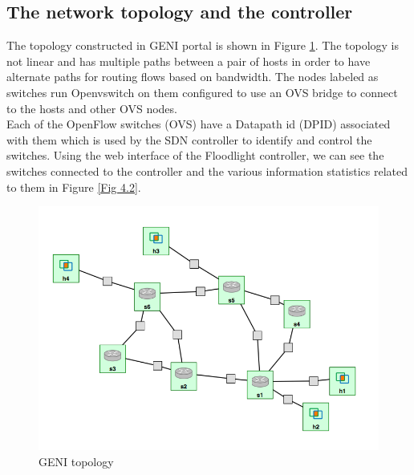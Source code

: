\documentclass[paper=a4, fontsize=11pt]{scrartcl}	%
\numberwithin{equation}{section}		%
\numberwithin{figure}{section}			%
\numberwithin{table}{section}				%
\begin{document}
\subsection{The network topology and the controller}
The topology constructed in GENI portal is shown in Figure \ref{Fig 4.1}. The topology is not linear and has multiple paths between a pair of hosts in order to have alternate paths for routing flows based on bandwidth. The nodes labeled as switches run Openvswitch on them configured to use an OVS bridge to connect to the hosts and other OVS nodes.
\\
Each of the OpenFlow switches (OVS) have a Datapath id (DPID) associated with them which is used by the SDN controller to identify and control the switches. Using the web interface of the Floodlight controller, we can see the switches connected to the controller and the various information statistics related to them in Figure \ref{Fig 4.2}.
\begin{figure}[H]
\begin{center}
\includegraphics[scale=0.4]{topology.png}   
\end{center}
 \caption{GENI topology}
 \label{Fig 4.1}
\end{figure}
\end{document}
